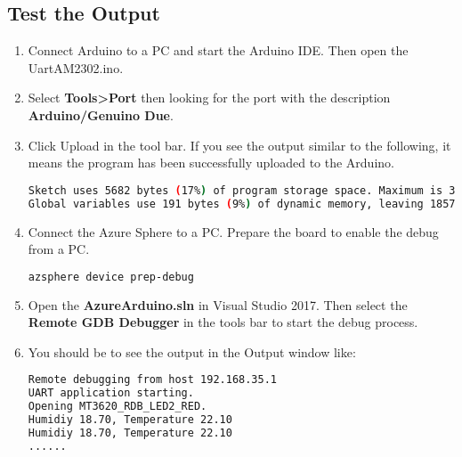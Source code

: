 \subsection{Test the Output}
\begin{enumerate}
    \item Connect Arduino to a PC and start the Arduino IDE. Then open the UartAM2302.ino.
    
    \item Select \textbf{Tools>Port} then looking for the port with the description \textbf{Arduino/Genuino Due}.
    
    \item Click Upload  in the tool bar. If you see the output similar to the following, it means the program has been successfully uploaded to the Arduino.
    \begin{lstlisting}[language=bash]
Sketch uses 5682 bytes (17%) of program storage space. Maximum is 32256 bytes.
Global variables use 191 bytes (9%) of dynamic memory, leaving 1857 bytes for local variables. Maximum is 2048 bytes.
    \end{lstlisting}
    
    \item Connect the Azure Sphere to a PC. Prepare the board to enable the debug from a PC.
    \begin{lstlisting}[language=bash]
    azsphere device prep-debug
    \end{lstlisting}
    
    \item Open the \textbf{AzureArduino.sln} in Visual Studio 2017. Then select the \textbf{Remote GDB Debugger} in the tools bar to start the debug process.
    
    \item You should be to see the output in the Output window like:
    \begin{lstlisting}[language=bash]
Remote debugging from host 192.168.35.1
UART application starting.
Opening MT3620_RDB_LED2_RED.
Humidiy 18.70, Temperature 22.10
Humidiy 18.70, Temperature 22.10
......
    \end{lstlisting}
    
\end{enumerate}